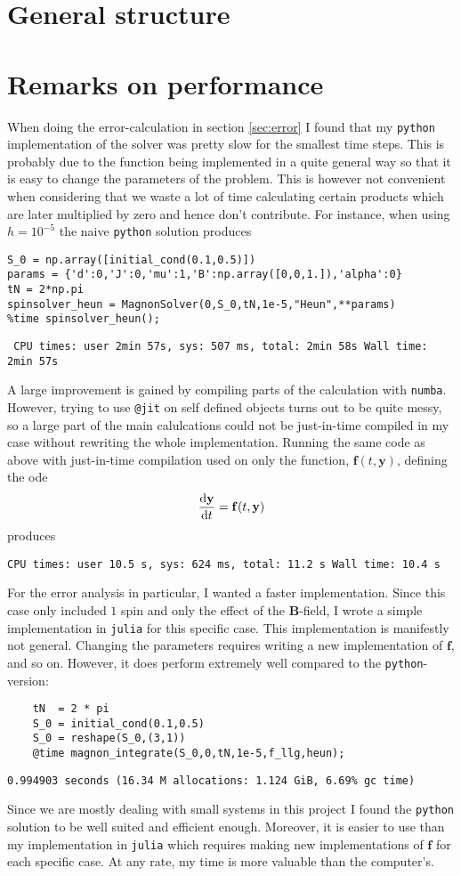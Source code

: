 \section{General structure}

\section{Remarks on performance}

When doing the error-calculation in section \ref{sec:error} I found that my \texttt{python} implementation of the solver was pretty slow for the smallest time steps. This is probably due to the function being implemented in a quite general way so that it is easy to change the parameters of the problem. This is however not convenient when considering that we waste a lot of time calculating certain products which are later multiplied by zero and hence don't contribute. For instance, when using $h = 10^{-5}$ the naive \texttt{python} solution produces
\begin{lstlisting}
S_0 = np.array([initial_cond(0.1,0.5)])
params = {'d':0,'J':0,'mu':1,'B':np.array([0,0,1.]),'alpha':0}
tN = 2*np.pi
spinsolver_heun = MagnonSolver(0,S_0,tN,1e-5,"Heun",**params)
%time spinsolver_heun();
\end{lstlisting}
\texttt{\small
	CPU times: user 2min 57s, sys: 507 ms, total: 2min 58s
	Wall time: 2min 57s
}

A large improvement is gained by compiling parts of the calculation with \texttt{numba}. However, trying to use \texttt{@jit} on self defined objects turns out to be quite messy, so a large part of the main calulcations could not be just-in-time compiled in my case without rewriting the whole implementation. Running the same code as above with just-in-time compilation used on only the function, $\mathbf{f}(t,\mathbf{y})$, defining the ode 
$$
	\frac{\text{d} \mathbf{y}}{\text{d} t} = \mathbf{f}(t,\mathbf{y})
$$	 
produces

\texttt{\small CPU times: user 10.5 s, sys: 624 ms, total: 11.2 s
Wall time: 10.4 s
}

For the error analysis in particular, I wanted a faster implementation. Since this case only included $1$ spin and only the effect of the $\mathbf{B}$-field, I wrote a simple implementation in \texttt{julia} for this specific case. This implementation is manifestly not general. Changing the parameters requires writing a new implementation of $\mathbf{f}$, and so on. However, it does perform extremely well compared to the \texttt{python}-version:

\begin{lstlisting}
	tN  = 2 * pi
	S_0 = initial_cond(0.1,0.5)
	S_0 = reshape(S_0,(3,1))
	@time magnon_integrate(S_0,0,tN,1e-5,f_llg,heun);
\end{lstlisting}
\texttt{\small 0.994903 seconds (16.34 M allocations: 1.124 GiB, 6.69\% gc time)}

Since we are mostly dealing with small systems in this project I found the \texttt{python} solution to be well suited and efficient enough. Moreover, it is easier to use than my implementation in \texttt{julia} which requires making new implementations of $\mathbf{f}$ for each specific case. At any rate, my time is more valuable than the computer's. 